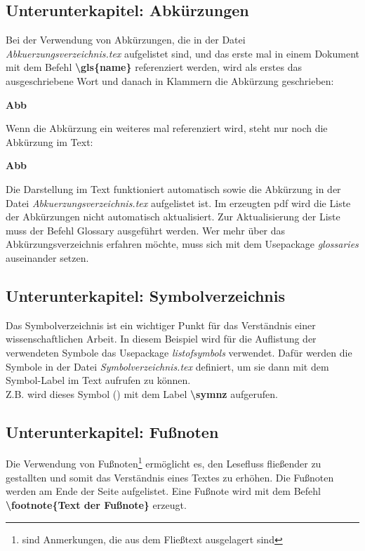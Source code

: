 \newpage
\subsection{Unterunterkapitel: Abkürzungen}
Bei der Verwendung von Abkürzungen, die in der Datei \textit{Abkuerzungsverzeichnis.tex} aufgelistet sind, und das erste mal in einem Dokument mit dem Befehl \textbf{\textbackslash gls\{name\}} referenziert werden, wird als erstes das ausgeschriebene Wort und danach in Klammern die Abkürzung geschrieben:

\textbf{ \gls{Abb} }

Wenn die Abkürzung ein weiteres mal referenziert wird, steht nur noch die Abkürzung im Text:

\textbf{ \gls{Abb} }

Die Darstellung im Text funktioniert automatisch sowie die Abkürzung in der Datei \textit{Abkuerzungsverzeichnis.tex} aufgelistet ist. Im erzeugten pdf wird die Liste der Abkürzungen nicht automatisch aktualisiert. Zur Aktualisierung der Liste muss der Befehl \dq Glossary\dq{} ausgeführt werden.
Wer mehr über das Abkürzungsverzeichnis erfahren möchte, muss sich mit dem Usepackage \textit{glossaries} auseinander setzen.

\newpage
\subsection{Unterunterkapitel: Symbolverzeichnis}
Das Symbolverzeichnis ist ein wichtiger Punkt für das Verständnis einer wissenschaftlichen Arbeit. In diesem Beispiel wird für die Auflistung der verwendeten Symbole das Usepackage \textit{listofsymbols} verwendet. Dafür werden die Symbole in der Datei \textit{Symbolverzeichnis.tex} definiert, um sie dann mit dem Symbol-Label im Text aufrufen zu können.
\\ Z.B. wird dieses Symbol (\symnz) mit dem Label \textbf{\textbackslash symnz} aufgerufen.



\subsection{Unterunterkapitel: Fußnoten}
Die Verwendung von Fußnoten\footnote{sind Anmerkungen, die aus dem Fließtext ausgelagert sind} ermöglicht es, den Lesefluss fließender zu gestallten und somit das Verständnis eines Textes zu erhöhen. Die Fußnoten werden am Ende der Seite aufgelistet. Eine Fußnote wird mit dem Befehl \textbf{\textbackslash footnote\{Text der Fußnote\}} erzeugt.


